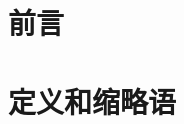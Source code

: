 \documentclass[a4paper]{report}
\begin{document}
\begin{CJK*}{UTF8}{}

\titleGP

\section{前言}
\section{定义和缩略语}

\end{CJK*}
\end{document}
